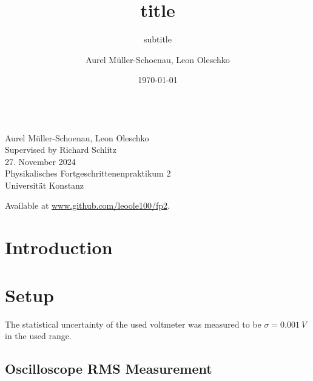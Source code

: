 \documentclass[
    parskip=half, 
    twoside=false,
    twocolumn=true,
    fontsize=11pt,
]{scrarticle}
\begin{document}
\title{title}
\subtitle{subtitle}
\author{Aurel Müller-Schoenau, Leon Oleschko}
\date{\dotdate\today}


\begin{titlepage}
    \sffamily
    \vspace*{3cm}
    {
        \fontsize{32}{32}
    }
    \vspace{.25cm}\\
    {
        \Large
        Aurel Müller-Schoenau, Leon Oleschko\\
        Supervised by Richard Schlitz
        \vspace{.05cm}\\
        27. November 2024
        \vspace{.25cm}\\
        \normalsize
        Physikalisches Fortgeschrittenenpraktikum 2\\
        Universität Konstanz
    }
    \vfill
    {
        \normalfont\normalsize
        
    }
    \vfill
    \begin{flushright}
        Available at \url{www.github.com/leoole100/fp2}.
    \end{flushright}
\end{titlepage}

\section{Introduction}

\section{Setup}
The statistical uncertainty of the used voltmeter was measured to be $\sigma = \SI{0.001}{V}$ in the used range.

\subsection*{Oscilloscope RMS Measurement}
\end{document}
